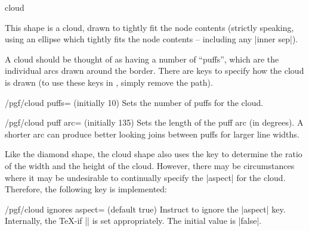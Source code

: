 \begin{shape}{cloud}

	This shape is a cloud, drawn to tightly fit the node contents
	(strictly speaking, using an ellipse which tightly fits the node
	contents -- including any |inner sep|).
	
\begin{codeexample}[]
\end{codeexample}

	A cloud should be thought of as having a number of ``puffs'', which
	are the individual arcs drawn around the border. There are \pgfname{}
	keys to specify how the cloud is drawn (to use these keys in
	\tikzname{}, simply remove the  path).
	
	\begin{key}{/pgf/cloud puffs= (initially 10)}
	  Sets the number of puffs for the cloud.
	\end{key}
	
	\begin{key}{/pgf/cloud puff arc= (initially 135)}
	  Sets the length of the puff arc (in degrees). A shorter arc can
	  produce better looking joins between puffs for larger line widths.
	\end{key}
	
	Like the diamond shape, the cloud shape also uses the
	 key to determine the ratio of the width and the
	height of the cloud. However, there may be circumstances where it may
	be undesirable to continually specify the |aspect| for the cloud.
	Therefore, the following key is implemented:
	
	\begin{key}{/pgf/cloud ignores aspect= (default true)}
		Instruct \pgfname{} to ignore the |aspect| key. Internally, the
		\TeX-if |\ifpgfcloudignoresaspect| is set appropriately. The initial
		value is |false|.

\begin{codeexample}[]
\end{codeexample}	
	

\end{key}
\end{shape}
